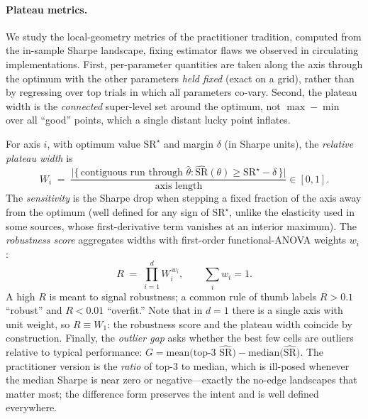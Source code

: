 \documentclass[11pt]{article}
\newcommand{\sr}{\mathrm{SR}}
\newcommand{\theyll}{\theta}
\begin{document}
\paragraph{Plateau metrics.} We study the local-geometry metrics of the
practitioner tradition, computed from the in-sample Sharpe landscape, fixing
estimator flaws we observed in circulating implementations. First, per-parameter
quantities are taken along the axis through the optimum with the other
parameters \emph{held fixed} (exact on a grid), rather than by regressing over
top trials in which all parameters co-vary. Second, the plateau width is the
\emph{connected} super-level set around the optimum, not $\max-\min$ over all
``good'' points, which a single distant lucky point inflates.

For axis $i$, with optimum value $\sr^\star$ and margin $\delta$ (in Sharpe
units), the \emph{relative plateau width} is
\begin{equation}
W_i \;=\; \frac{\big|\{\,\text{contiguous run through }\hat\theyll : \widehat{\sr}(\theyll)\ge \sr^\star-\delta\,\}\big|}{\text{axis length}} \in [0,1].
\end{equation}
The \emph{sensitivity} is the Sharpe drop when stepping a fixed fraction of the
axis away from the optimum (well defined for any sign of $\sr^\star$, unlike the
elasticity used in some sources, whose first-derivative term vanishes at an
interior maximum). The \emph{robustness score} aggregates widths with
first-order functional-ANOVA weights $w_i$ \citep{hutter2014fanova}:
\begin{equation}
R \;=\; \prod_{i=1}^{d} W_i^{\,w_i}, \qquad \textstyle\sum_i w_i = 1 .
\label{eq:R}
\end{equation}
A high $R$ is meant to signal robustness; a common rule of thumb labels $R>0.1$
``robust'' and $R<0.01$ ``overfit.'' Note that in $d{=}1$ there is a single
axis with unit weight, so $R \equiv W_1$: the robustness score and the plateau
width coincide by construction. Finally, the \emph{outlier gap} asks whether the
best few cells are outliers relative to typical performance:
$G = \mathrm{mean}\big(\text{top-3 } \widehat{\sr}\big) - \mathrm{median}\big(\widehat{\sr}\big)$.
The practitioner version is the \emph{ratio} of top-3 to median, which is
ill-posed whenever the median Sharpe is near zero or negative---exactly the
no-edge landscapes that matter most; the difference form preserves the intent
and is well defined everywhere.
\end{document}
